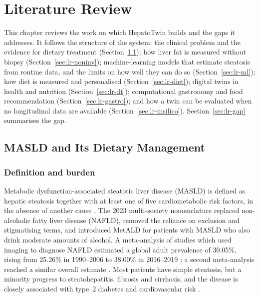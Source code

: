 \chapter{Literature Review}
\label{chap:litreview}

This chapter reviews the work on which HepatoTwin builds and the gaps it addresses. It follows the structure of the system: the clinical problem and the evidence for dietary treatment (Section~\ref{sec:lr-masld}); how liver fat is measured without biopsy (Section~\ref{sec:lr-noninv}); machine-learning models that estimate steatosis from routine data, and the limits on how well they can do so (Section~\ref{sec:lr-ml}); how diet is measured and personalised (Section~\ref{sec:lr-diet}); digital twins in health and nutrition (Section~\ref{sec:lr-dt}); computational gastronomy and food recommendation (Section~\ref{sec:lr-gastro}); and how a twin can be evaluated when no longitudinal data are available (Section~\ref{sec:lr-insilico}). Section~\ref{sec:lr-gap} summarises the gap.

\section{MASLD and Its Dietary Management}
\label{sec:lr-masld}

\subsection{Definition and burden}

Metabolic dysfunction-associated steatotic liver disease (MASLD) is defined as hepatic steatosis together with at least one of five cardiometabolic risk factors, in the absence of another cause \cite{rinella2023nomenclature}. The 2023 multi-society nomenclature replaced non-alcoholic fatty liver disease (NAFLD), removed the reliance on exclusion and stigmatising terms, and introduced MetALD for patients with MASLD who also drink moderate amounts of alcohol. A meta-analysis of studies which used imaging to diagnose NAFLD estimated a global adult prevalence of 30.05\%, rising from 25.26\% in 1990--2006 to 38.00\% in 2016--2019 \cite{younossi2023global}; a second meta-analysis reached a similar overall estimate \cite{riazi2022prevalence}. Most patients have simple steatosis, but a minority progress to steatohepatitis, fibrosis and cirrhosis, and the disease is closely associated with type~2 diabetes and cardiovascular risk \cite{easl2024masld,rinella2023aasld}.

